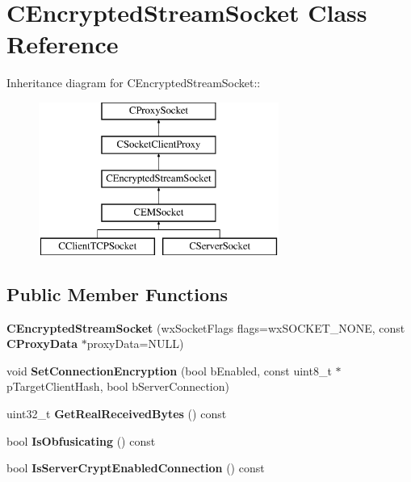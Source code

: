 \section{CEncryptedStreamSocket Class Reference}
\label{classCEncryptedStreamSocket}
Inheritance diagram for CEncryptedStreamSocket::\begin{figure}[H]
\begin{center}
\leavevmode
\includegraphics[height=5cm]{classCEncryptedStreamSocket}
\end{center}
\end{figure}
\subsection*{Public Member Functions}
\begin{DoxyCompactItemize}
\item 
{\bfseries CEncryptedStreamSocket} (wxSocketFlags flags=wxSOCKET\_\-NONE, const {\bf CProxyData} $\ast$proxyData=NULL)\label{classCEncryptedStreamSocket_ab1e99f49826aed1e3e6e1357fde2baea}

\item 
void {\bfseries SetConnectionEncryption} (bool bEnabled, const uint8\_\-t $\ast$pTargetClientHash, bool bServerConnection)\label{classCEncryptedStreamSocket_a8c5a412c9d75b9ae729c3db3cba861c8}

\item 
uint32\_\-t {\bf GetRealReceivedBytes} () const \label{classCEncryptedStreamSocket_abe211b5bcb6b79f83c61f1d1f3b91bd7}

\item 
bool {\bfseries IsObfusicating} () const \label{classCEncryptedStreamSocket_a47c26d725e57a9f54297b0cb68755943}

\item 
bool {\bfseries IsServerCryptEnabledConnection} () const \label{classCEncryptedStreamSocket_a6ebfb241b8b702655dac010e87b3d814}

\end{DoxyCompactItemize}
